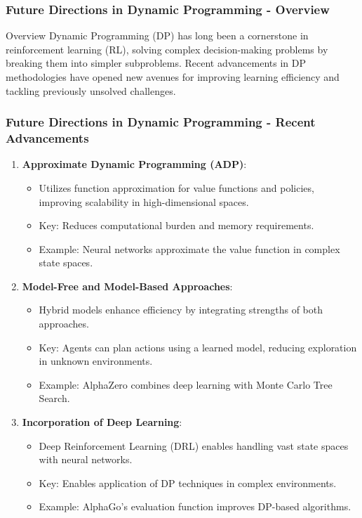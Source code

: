 \documentclass[aspectratio=169]{beamer}
\begin{document}
\begin{frame}[fragile]
    \frametitle{Future Directions in Dynamic Programming - Overview}
    \begin{block}{Overview}
        Dynamic Programming (DP) has long been a cornerstone in reinforcement learning (RL), solving complex decision-making problems by breaking them into simpler subproblems. Recent advancements in DP methodologies have opened new avenues for improving learning efficiency and tackling previously unsolved challenges.
    \end{block}
\end{frame}

\begin{frame}[fragile]
    \frametitle{Future Directions in Dynamic Programming - Recent Advancements}
    \begin{enumerate}
        \item \textbf{Approximate Dynamic Programming (ADP)}:
            \begin{itemize}
                \item Utilizes function approximation for value functions and policies, improving scalability in high-dimensional spaces.
                \item Key: Reduces computational burden and memory requirements.
                \item Example: Neural networks approximate the value function in complex state spaces.
            \end{itemize}
        
        \item \textbf{Model-Free and Model-Based Approaches}:
            \begin{itemize}
                \item Hybrid models enhance efficiency by integrating strengths of both approaches.
                \item Key: Agents can plan actions using a learned model, reducing exploration in unknown environments.
                \item Example: AlphaZero combines deep learning with Monte Carlo Tree Search.
            \end{itemize}
        
        \item \textbf{Incorporation of Deep Learning}:
            \begin{itemize}
                \item Deep Reinforcement Learning (DRL) enables handling vast state spaces with neural networks.
                \item Key: Enables application of DP techniques in complex environments.
                \item Example: AlphaGo's evaluation function improves DP-based algorithms.
            \end{itemize}
        

\end{enumerate}
\end{frame}
\end{document}
